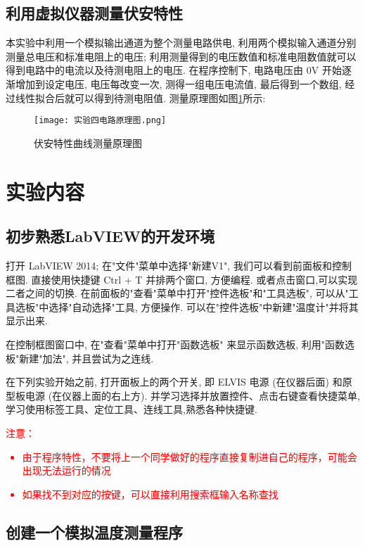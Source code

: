 \documentclass[11pt]{article}
\begin{document}
	\subsection{利用虚拟仪器测量伏安特性}
	
	本实验中利用一个模拟输出通道为整个测量电路供电, 利用两个模拟输入通道分别测量总电压和标准电阻上的电压; 利用测量得到的电压数值和标准电阻数值就可以得到电路中的电流以及待测电阻上的电压. 在程序控制下, 电路电压由 $0\mathrm V$ 开始逐渐增加到设定电压, 电压每改变一次, 测得一组电压电流值, 最后得到一个数组, 经过线性拟合后就可以得到待测电阻值. 测量原理图如图\ref{fig:principle}所示:
	
	\begin{figure}[htbp]
		\centering
		\texttt{[image: 实验四电路原理图.png]}
		\caption{伏安特性曲线测量原理图}
		\label{fig:principle}
	\end{figure}
	
	
	
	
\section{实验内容}


\subsection{初步熟悉LabVIEW的开发环境}
打开 LabVIEW 2014; 在"文件"菜单中选择"新建V1", 我们可以看到前面板和控制框图. 
直接使用快捷键 Ctrl + T 并排两个窗口, 方便编程. 或者点击窗口,可以实现二者之间的切换.
在前面板的"查看"菜单中打开"控件选板"和"工具选板", 可以从"工具选板"中选择"自动选择"工具, 方便操作. 
可以在"控件选板"中新建"温度计"并将其显示出来. 

在控制框图窗口中, 
在"查看"菜单中打开"函数选板" 来显示函数选板, 
利用"函数选板"新建"加法", 并且尝试为之连线.

在下列实验开始之前, 
打开面板上的两个开关, 
即 ELVIS 电源 (在仪器后面) 和原型板电源 (在仪器上面的右上方).
并学习选择并放置控件、点击右键查看快捷菜单,学习使用标签工具、定位工具、连线工具,熟悉各种快捷键.

\textcolor{red}{注意：
	\begin{itemize}
		\item 由于程序特性，不要将上一个同学做好的程序直接复制进自己的程序，可能会出现无法运行的情况
		\item 如果找不到对应的按键，可以直接利用搜索框输入名称查找
	\end{itemize}}

\subsection{创建一个模拟温度测量程序}
\end{document}
